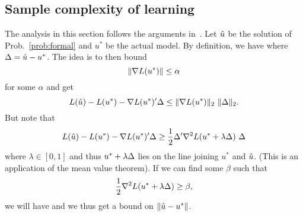 \documentclass[letterpaper, 12pt, reqno]{amsart}
\begin{document}
\subsection{Sample complexity of learning}
The analysis in this section follows the arguments in~\cite{negahban2012restricted}. Let $\hat{u}$ be the solution of Prob.~\ref{prob:formal} and $u^*$ be the actual model. By definition, we have
where $\Delta = \hat{u} - u^*$. The idea is to then bound
$$
\lVert\nabla L(u^*)\rVert \leq \alpha
$$
for some $\alpha$ and get
$$
L(\hat{u}) - L(u^*) - \nabla L(u^*)' \Delta \leq \lVert\nabla L(u^*)\rVert_2\ \lVert\Delta\rVert_2.
$$
But note that
$$
L(\hat{u}) - L(u^*) - \nabla L(u^*)' \Delta \geq \frac{1}{2} \Delta' \nabla^2 L(u^* + \lambda \Delta)\ \Delta
$$
where $\lambda \in [0,1]$ and thus $u^* + \lambda \Delta$ lies on the line joining $u^*$ and $\hat{u}$. (This is an application of the mean value theorem).
If we can find some $\beta$ such that
$$
\frac{1}{2} \nabla^2 L(u^* + \lambda \Delta) \geq \beta,
$$
we will have
and we thus get a bound on $\lVert\hat{u} - u^*\rVert$.



{
\small
\linespread{1.5}


}
\end{document}
